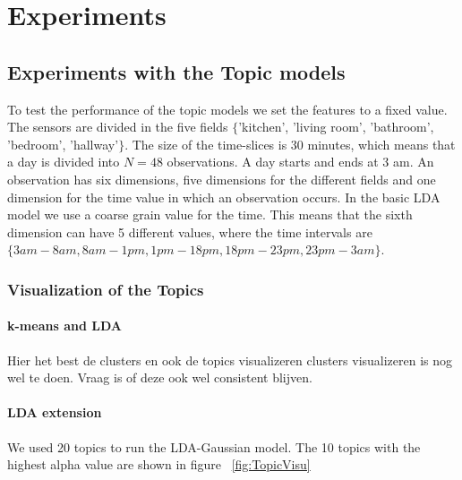 \documentclass[11pt,a4paper]{article}
\begin{document}
\section{Experiments}
\label{sec:Experiments}

\subsection{Experiments with the Topic models}
To test the performance of the topic models we set the features to a fixed value. The sensors are divided in the five fields $\{$'kitchen', 'living room', 'bathroom', 'bedroom', 'hallway'$\}$. The size of the time-slices is 30 minutes, which means that a day is divided into $N=48$ observations. A day starts and ends at 3 am. An observation has six dimensions, five dimensions for the different fields and one dimension for the time value in which an observation occurs. In the basic LDA model we use a coarse grain value for the time. This means that the sixth dimension can have 5 different values, where the time intervals are $\{ 3am - 8am, 8am - 1pm, 1pm - 18pm, 18pm - 23pm, 23pm - 3am  \}$.
\subsubsection{Visualization of the Topics}
\paragraph{k-means and LDA}
Hier het best de clusters en ook de topics visualizeren
clusters visualizeren is nog wel te doen. Vraag is of deze ook wel consistent blijven.

\paragraph{LDA extension}
We used 20 topics to run the LDA-Gaussian model. The 10 topics with the highest alpha value are shown in figure ~\ref{fig:TopicVisu}
\end{document}
